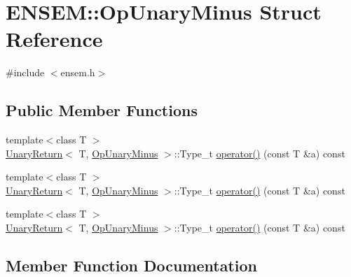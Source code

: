 \hypertarget{structENSEM_1_1OpUnaryMinus}{}\section{E\+N\+S\+EM\+:\+:Op\+Unary\+Minus Struct Reference}
\label{structENSEM_1_1OpUnaryMinus}


{\ttfamily \#include $<$ensem.\+h$>$}

\subsection*{Public Member Functions}
\begin{DoxyCompactItemize}
\item 
{\footnotesize template$<$class T $>$ }\\\mbox{\hyperlink{structENSEM_1_1UnaryReturn}{Unary\+Return}}$<$ T, \mbox{\hyperlink{structENSEM_1_1OpUnaryMinus}{Op\+Unary\+Minus}} $>$\+::Type\+\_\+t \mbox{\hyperlink{structENSEM_1_1OpUnaryMinus_a34e70d7d677f60520ca94fa732d26926}{operator()}} (const T \&a) const
\item 
{\footnotesize template$<$class T $>$ }\\\mbox{\hyperlink{structENSEM_1_1UnaryReturn}{Unary\+Return}}$<$ T, \mbox{\hyperlink{structENSEM_1_1OpUnaryMinus}{Op\+Unary\+Minus}} $>$\+::Type\+\_\+t \mbox{\hyperlink{structENSEM_1_1OpUnaryMinus_a34e70d7d677f60520ca94fa732d26926}{operator()}} (const T \&a) const
\item 
{\footnotesize template$<$class T $>$ }\\\mbox{\hyperlink{structENSEM_1_1UnaryReturn}{Unary\+Return}}$<$ T, \mbox{\hyperlink{structENSEM_1_1OpUnaryMinus}{Op\+Unary\+Minus}} $>$\+::Type\+\_\+t \mbox{\hyperlink{structENSEM_1_1OpUnaryMinus_a34e70d7d677f60520ca94fa732d26926}{operator()}} (const T \&a) const
\end{DoxyCompactItemize}


\subsection{Member Function Documentation}
\mbox{\label{structENSEM_1_1OpUnaryMinus_a34e70d7d677f60520ca94fa732d26926}} 
